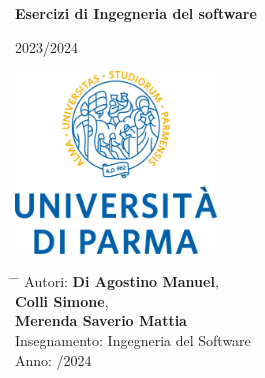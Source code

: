 \documentclass[12pt,a4paper]{article}
\title{}
\author{}
\date{}
\begin{document}
	
	\newcommand{\subf}[2]{%
		{\small\begin{tabular}[t]{@{}c@{}}
				#1\\#2
		\end{tabular}}%
	}
	
	\begin{titlepage}
		\begin{center}
			\vspace*{3cm}
			
			\Huge
			\textbf{Esercizi di Ingegneria del software}
			
			\vspace{0.3cm}
			\Huge
			2023/2024
			
			\vspace{0.8cm}
			\large
			
			
			
			\vspace{0.5cm}
			\LARGE
			
			
			\vspace{1.5cm}
			
			\textbf{}
            \includegraphics[width=0.4\textwidth]{images/uniprLogo.jpg}
			
			\vfill
			
			
			
			\vspace{0.8cm}
			
			
			
			\Large
			
			
			
			
		\end{center}
		\Large
		\begin{tabbing}
			\hspace*{1em}\= \hspace*{8em} \= \kill %
			\> Autori:	\> \textbf{Di Agostino Manuel}, \\
			\>			\>\textbf{Colli Simone}, \\
			\>      	\>\textbf{Merenda Saverio Mattia} \\
			\> Insegnamento:\>  Ingegneria del Software  \\
			\> Anno:  \> 2023/2024
		\end{tabbing}
		
	\end{titlepage}
\end{document}
